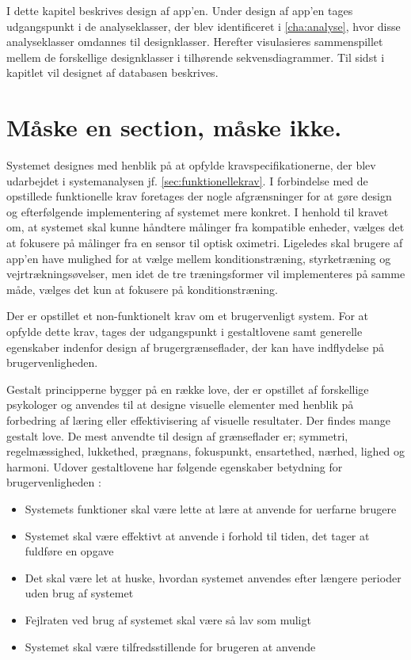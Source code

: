 I dette kapitel beskrives design af app'en. Under design af app'en tages udgangspunkt i de analyseklasser, der blev identificeret i \autoref{cha:analyse}, hvor disse analyseklasser omdannes til designklasser. Herefter visulasieres sammenspillet mellem de forskellige designklasser i tilhørende sekvensdiagrammer. Til sidst i kapitlet vil designet af databasen beskrives.

\section{Måske en section, måske ikke.}

Systemet designes med henblik på at opfylde kravspecifikationerne, der blev udarbejdet i systemanalysen jf. \autoref{sec:funktionellekrav}. I forbindelse med de opstillede funktionelle krav foretages der nogle afgrænsninger for at gøre design og efterfølgende implementering af systemet mere konkret. I henhold til kravet om, at systemet skal kunne håndtere målinger fra kompatible enheder, vælges det at fokusere på målinger fra en sensor til optisk oximetri. Ligeledes skal brugere af app'en have mulighed for at vælge mellem konditionstræning, styrketræning og vejrtrækningsøvelser, men idet de tre træningsformer vil implementeres på samme måde, vælges det kun at fokusere på  konditionstræning. 

Der er opstillet et non-funktionelt krav om et brugervenligt system. For at opfylde dette krav, tages der udgangspunkt i gestaltlovene samt generelle egenskaber indenfor design af brugergrænseflader, der kan have indflydelse på brugervenligheden. 

Gestalt principperne bygger på en række love, der er opstillet af forskellige psykologer og anvendes til at designe visuelle elementer med henblik på forbedring af læring eller effektivisering af visuelle resultater. Der findes mange gestalt love. De mest anvendte til design af grænseflader er; symmetri, regelmæssighed, lukkethed, prægnans, fokuspunkt, ensartethed, nærhed, lighed og harmoni.\cite{Chang2002} Udover gestaltlovene har følgende egenskaber betydning for brugervenligheden \cite{ferre2001}:
\begin{itemize}
\item Systemets funktioner skal være lette at lære at anvende for uerfarne brugere
\item Systemet skal være effektivt at anvende i forhold til tiden, det tager at fuldføre en opgave
\item Det skal være let at huske, hvordan systemet anvendes efter længere perioder uden brug af systemet
\item Fejlraten ved brug af systemet skal være så lav som muligt
\item Systemet skal være tilfredsstillende for brugeren at anvende
\end{itemize}
 

 





